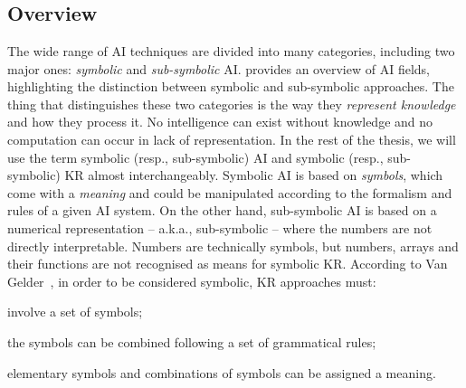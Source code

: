 
\chapter[Artificial Intelligence]{}
\label{ch:ai}
\minitoc

\section{Overview}\label{sec:ai-overview}

The wide range of \gls{AI} techniques are divided into many categories, including two major ones: \emph{symbolic} and \emph{sub-symbolic} \gls{AI}.
%
 provides an overview of \gls{AI} fields, highlighting the distinction between symbolic and sub-symbolic approaches.
%
The thing that distinguishes these two categories is the way they \emph{represent knowledge} and how they process it.
%
No intelligence can exist without knowledge and no computation can occur in lack of representation.
%
In the rest of the thesis, we will use the term symbolic (resp., sub-symbolic) \gls{AI} and symbolic (resp., sub-symbolic) \gls{KR} almost interchangeably.
%
Symbolic \gls{AI} is based on \emph{symbols}, which come with a \emph{meaning} and could be manipulated according to the formalism and rules of a given \gls{AI} system.
%
On the other hand, sub-symbolic \gls{AI} is based on a numerical representation -- a.k.a., sub-symbolic -- where the numbers are not directly interpretable.
%
Numbers are technically symbols, but numbers, arrays and their functions are not recognised as means for symbolic \gls{KR}.
%
According to Van Gelder~\cite{DBLP:conf/ogai/Gelder90}, in order to be considered symbolic, \gls{KR} approaches must:
%
\begin{requirements}
    \item \label{itm:symbolic-req-1} involve a set of symbols;
    \item \label{itm:symbolic-req-2} the symbols can be combined following a set of grammatical rules;
    \item \label{itm:symbolic-req-3} elementary symbols and combinations of symbols can be assigned a meaning.
\end{requirements}
%
